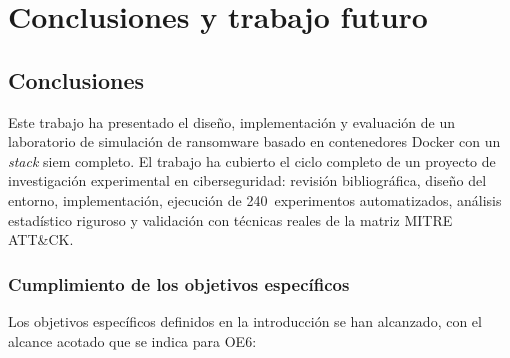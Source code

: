 \documentclass[../main.tex]{subfiles}
\begin{document}
\chapter{Conclusiones y trabajo futuro}
\label{C:conclusiones}

\section{Conclusiones}

Este trabajo ha presentado el diseño, implementación y evaluación de un laboratorio
de simulación de ransomware basado en contenedores Docker con un \emph{stack}
\gls{siem} completo. El trabajo ha cubierto el ciclo completo de un proyecto de
investigación experimental en ciberseguridad: revisión bibliográfica, diseño del
entorno, implementación, ejecución de 240~experimentos automatizados, análisis
estadístico riguroso y validación con técnicas reales de la matriz MITRE ATT\&CK.

\subsection{Cumplimiento de los objetivos específicos}

Los objetivos específicos definidos en la introducción se han alcanzado, con el
alcance acotado que se indica para OE6:
\end{document}
